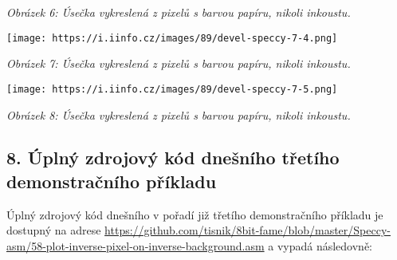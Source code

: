 \documentclass{article}
\renewcommand\includegraphics[2][]{}
\begin{document}
\emph{Obrázek 6: Úsečka vykreslená z pixelů s barvou papíru, nikoli
inkoustu.}

\texttt{[image: https://i.iinfo.cz/images/89/devel-speccy-7-4.png]}

\emph{Obrázek 7: Úsečka vykreslená z pixelů s barvou papíru, nikoli
inkoustu.}

\texttt{[image: https://i.iinfo.cz/images/89/devel-speccy-7-5.png]}

\emph{Obrázek 8: Úsečka vykreslená z pixelů s barvou papíru, nikoli
inkoustu.}

\hypertarget{k08}{%
\subsection{8. Úplný zdrojový kód dnešního třetího demonstračního
příkladu}\label{k08}}

Úplný zdrojový kód dnešního v pořadí již třetího demonstračního příkladu
je dostupný na adrese
\url{https://github.com/tisnik/8bit-fame/blob/master/Speccy-asm/58-plot-inverse-pixel-on-inverse-background.asm}
a vypadá následovně:
\end{document}
